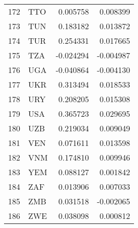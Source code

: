 \begin{tabular}{llrr}
172 & TTO & 0.005758 & 0.008399 \\
173 & TUN & 0.183182 & 0.013872 \\
174 & TUR & 0.254331 & 0.017665 \\
175 & TZA & -0.024294 & -0.004987 \\
176 & UGA & -0.040864 & -0.004130 \\
177 & UKR & 0.313494 & 0.018533 \\
178 & URY & 0.208205 & 0.015308 \\
179 & USA & 0.365723 & 0.029695 \\
180 & UZB & 0.219034 & 0.009049 \\
181 & VEN & 0.071611 & 0.013598 \\
182 & VNM & 0.174810 & 0.009946 \\
183 & YEM & 0.088127 & 0.001842 \\
184 & ZAF & 0.013906 & 0.007033 \\
185 & ZMB & 0.031518 & -0.002065 \\
186 & ZWE & 0.038098 & 0.000812 \\
\bottomrule
\end{tabular}
